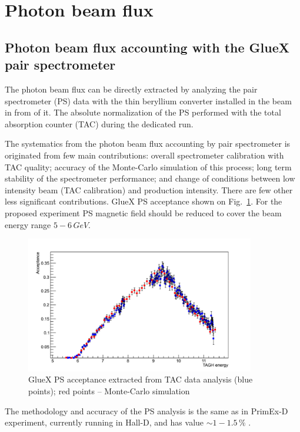 \section{Photon beam flux  \label{sec:flux}   }

\subsection{Photon beam flux accounting with the GlueX pair spectrometer}
The photon beam flux can be directly extracted by analyzing the pair
spectrometer (PS) data with the thin beryllium converter installed in
the beam in from of it.  The absolute normalization of the PS
performed with the total absorption counter (TAC) during the dedicated
run.

The systematics from the photon beam flux accounting by pair
spectrometer is originated from few main contributions: overall
spectrometer calibration with TAC quality; accuracy of the Monte-Carlo
simulation of this process; long term stability of the spectrometer
performance; and change of conditions between low intensity beam (TAC
calibration) and production intensity.  There are few other less
significant contributions. GlueX PS acceptance \cite{hdnote3684} shown
on Fig.~\ref{fig:psacc}. For the proposed experiment PS magnetic field
should be reduced to cover the beam energy range $5-6\,GeV$.
\begin{figure}[tpb]
\begin{center}
\includegraphics[width=10cm,angle=0]{figures/ps_acceptance.pdf}
\end{center}
\caption{GlueX PS acceptance extracted from TAC data analysis (blue points);
red points -- Monte-Carlo simulation}
\label{fig:psacc}
\end{figure}
The methodology and accuracy of the PS analysis is the same as in
PrimEx-D experiment, currently running in Hall-D, and has value
$\sim1-1.5\,\%$ \cite{PrimexDexp}.

